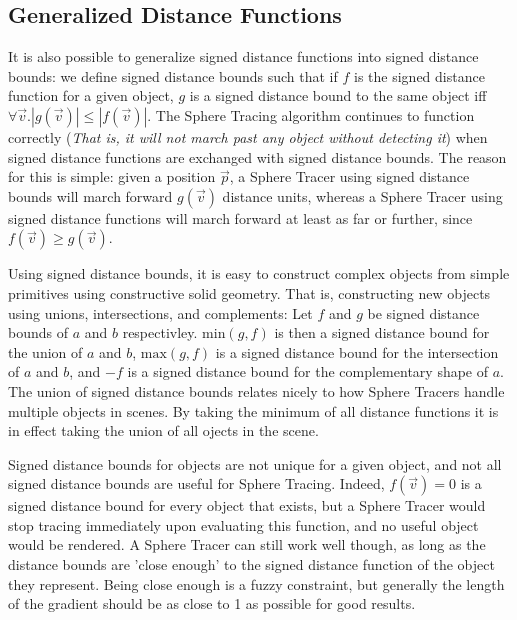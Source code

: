		\subsection{Generalized Distance Functions}

			It is also possible to generalize signed distance functions into
			signed distance bounds: we define signed distance bounds such that
			if $f$ is the signed distance function for a given object, $g$ is a
			signed distance bound to the same object iff $\forall{} \vec{v}.
			|g(\vec{v})| \leq |f(\vec{v})|$. The Sphere Tracing algorithm
			continues to function correctly (\emph{That is, it will not march
			past any object without detecting it}) when signed distance
			functions are exchanged with signed distance bounds. The reason for
			this is simple: given a position $\vec{p}$, a Sphere Tracer using
			signed distance bounds will march forward $g(\vec{v})$ distance
			units, whereas a Sphere Tracer using signed distance functions will
			march forward at least as far or further, since $f(\vec{v}) \geq
			g(\vec{v})$.

			Using signed distance bounds, it is easy to construct complex
			objects from simple primitives using constructive solid geometry.
			That is, constructing new objects using unions, intersections, and
			complements: Let $f$ and $g$ be signed distance bounds of $a$ and
			$b$ respectivley. $\textrm{min}(g, f)$ is then a signed distance
			bound for the union of $a$ and $b$, $\textrm{max}(g, f)$ is a
			signed distance bound for the intersection of $a$ and $b$, and $-f$
			is a signed distance bound for the complementary shape of
			$a$\cite{Hart1996}. The union of signed distance bounds relates nicely
			to how Sphere Tracers handle multiple objects in scenes. By taking
			the minimum of all distance functions it is in effect taking the
			union of all ojects in the scene.

			Signed distance bounds for objects are not unique for a given
			object, and not all signed distance bounds are useful for Sphere
			Tracing. Indeed, $f(\vec{v}) = 0$ is a signed distance bound for
			every object that exists, but a Sphere Tracer would stop tracing
			immediately upon evaluating this function, and no useful object
			would be rendered. A Sphere Tracer can still work well though, as
			long as the distance bounds are 'close enough' to the signed
			distance function of the object they represent\cite{InigoQuilez}. Being
			close enough is a fuzzy constraint, but generally the length of the
			gradient should be as close to 1 as possible for good
			results\cite{Keinert}.


